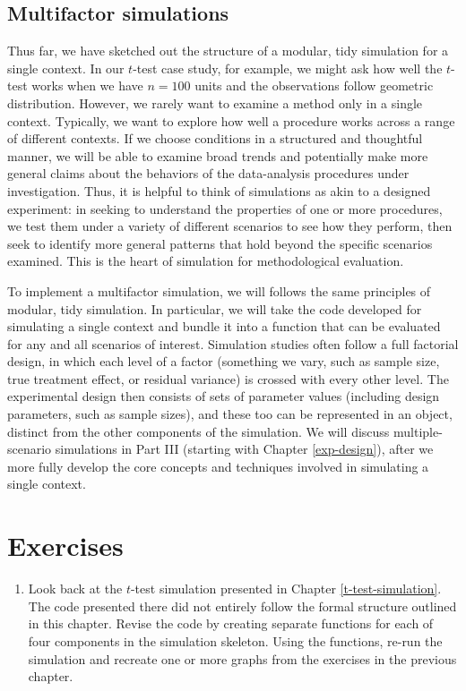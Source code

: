 \documentclass[
]{book}
\providecommand{\tightlist}{%
  \setlength{\itemsep}{0pt}\setlength{\parskip}{0pt}}
\begin{document}
\subsection{Multifactor simulations}\label{multifactor-simulations}

Thus far, we have sketched out the structure of a modular, tidy simulation for a single context.
In our \(t\)-test case study, for example, we might ask how well the \(t\)-test works when we have \(n=100\) units and the observations follow geometric distribution.
However, we rarely want to examine a method only in a single context.
Typically, we want to explore how well a procedure works across a range of different contexts.
If we choose conditions in a structured and thoughtful manner, we will be able to examine broad trends and potentially make more general claims about the behaviors of the data-analysis procedures under investigation.
Thus, it is helpful to think of simulations as akin to a designed experiment: in seeking to understand the properties of one or more procedures, we test them under a variety of different scenarios to see how they perform, then seek to identify more general patterns that hold beyond the specific scenarios examined.
This is the heart of simulation for methodological evaluation.

To implement a multifactor simulation, we will follows the same principles of modular, tidy simulation.
In particular, we will take the code developed for simulating a single context and bundle it into a function that can be evaluated for any and all scenarios of interest.
Simulation studies often follow a full factorial design, in which each level of a factor (something we vary, such as sample size, true treatment effect, or residual variance) is crossed with every other level.
The experimental design then consists of sets of parameter values (including design parameters, such as sample sizes), and these too can be represented in an object, distinct from the other components of the simulation.
We will discuss multiple-scenario simulations in Part III (starting with Chapter \ref{exp-design}), after we more fully develop the core concepts and techniques involved in simulating a single context.

\section{Exercises}\label{exercises-2}

\begin{enumerate}
\def\labelenumi{\arabic{enumi}.}
\tightlist
\item
  Look back at the \(t\)-test simulation presented in Chapter \ref{t-test-simulation}. The code presented there did not entirely follow the formal structure outlined in this chapter. Revise the code by creating separate functions for each of four components in the simulation skeleton. Using the functions, re-run the simulation and recreate one or more graphs from the exercises in the previous chapter.
\end{enumerate}
\end{document}
